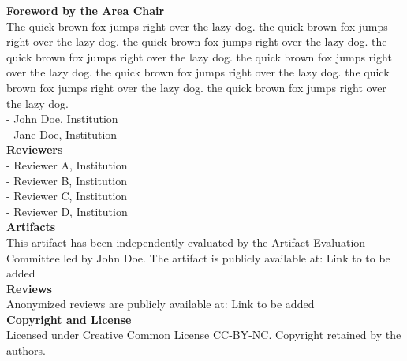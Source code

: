 \parbox{\textwidth}{%
    \vspace{5pt}
    {\Large \bf Foreword by the Area Chair}\\
    
    The quick brown fox jumps right over the lazy dog. the quick brown fox jumps right over the lazy dog. the quick brown fox jumps right over the lazy dog. the quick brown fox jumps right over the lazy dog. the quick brown fox jumps right over the lazy dog. the quick brown fox jumps right over the lazy dog. the quick brown fox jumps right over the lazy dog. the quick brown fox jumps right over the lazy dog.\\

    - John Doe, Institution\\
    - Jane Doe, Institution\\

    {\Large \bf Reviewers}\\

    - Reviewer A, Institution\\
    - Reviewer B, Institution\\
    - Reviewer C, Institution\\
    - Reviewer D, Institution\\
    
    {\Large \bf Artifacts}\\

    This artifact has been independently evaluated by the Artifact Evaluation Committee led by
    John Doe.
    The artifact is publicly available at: Link to to be added\\

    {\Large \bf Reviews}\\

    Anonymized reviews are publicly available at: Link to be added\\

    {\Large \bf Copyright and License}\\

    Licensed under Creative Common License CC-BY-NC. Copyright retained by the authors. 

    
  }%

  \vspace{10pt}

